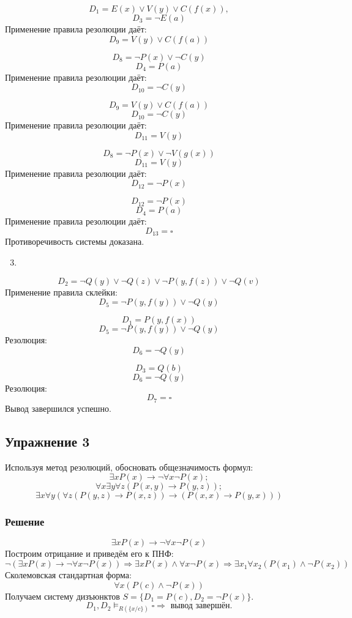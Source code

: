 \documentclass[11pt]{article}
\begin{document}
$$D_1 = E(x) \lor V(y) \lor C(f(x)),$$
$$D_3 = \lnot E(a)$$
Применение правила резолюции даёт:
$$D_9 = V(y) \lor C(f(a))$$

$$D_8 = \lnot P(x) \lor \lnot C(y)$$
$$D_4 = P(a)$$
Применение правила резолюции даёт:
$$D_{10} = \lnot C(y)$$

$$D_9 = V(y) \lor C(f(a))$$
$$D_{10} = \lnot C(y)$$
Применение правила резолюции даёт:
$$D_{11} = V(y)$$

$$D_8 = \lnot P(x) \lor \lnot V(g(x))$$
$$D_{11} = V(y)$$
Применение правила резолюции даёт:
$$D_{12} = \lnot P(x)$$

$$D_{12} = \lnot P(x)$$
$$D_4 = P(a)$$
Применение правила резолюции даёт:
$$D_{13} = \square$$
Противоречивость системы доказана.

\begin{enumerate}
\setcounter{enumi}{2}
\item 
\end{enumerate}
$$D_2 = \lnot Q(y) \lor \lnot Q(z) \lor \lnot P(y, f(z)) \lor \lnot Q(v)$$
Применение правила склейки:
$$D_5 = \lnot P(y, f(y)) \lor \lnot Q(y)$$

$$D_1 = P(y, f(x))$$
$$D_5 = \lnot P(y, f(y)) \lor \lnot Q(y)$$
Резолюция:
$$D_6 = \lnot Q(y)$$

$$D_3 = Q(b)$$
$$D_6 = \lnot Q(y)$$
Резолюция:
$$D_7 = \square$$
Вывод завершился успешно.
\subsection{Упражнение 3}
\label{sec:orgc8577ca}
Используя метод резолюций, обосновать общезначимость формул:
$$\exists x P(x) \to \lnot \forall x \lnot P(x);$$
$$\forall x \exists y \forall z (P(x, y) \to P(y, z));$$
$$\exists x \forall y (\forall z (P(y, z) \to P(x, z)) \to (P(x, x) \to P(y, x)))$$
\subsubsection{Решение}
\label{sec:org3e3796f}
\begin{equation*}
\exists x P(x) \to \lnot \forall x \lnot P(x)
\end{equation*}
Построим отрицание и приведём его к ПНФ:
\begin{equation*}
\lnot (\exists x P(x) \to \lnot \forall x \lnot P(x)) \Rightarrow \exists x P(x) \land \forall x \lnot P(x) \Rightarrow \exists x_1 \forall x_2 (P(x_1) \land \lnot P(x_2))
\end{equation*}
Сколемовская стандартная форма:
\begin{equation*}
\forall x (P(c) \land \lnot P(x))
\end{equation*}
Получаем систему дизъюнктов $S = \{D_1 = P(c), D_2 = \lnot P(x)\}$.
$$D_1, D_2 \models_{R(\{x/c\})} \square \Rightarrow \text{ вывод завершён.}$$
\end{document}
